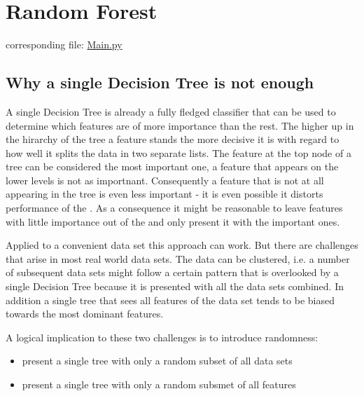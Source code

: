 \documentclass[letterpaper,10pt,english]{sphinxmanual}
\begin{document}
\section{Random Forest}
\label{\detokenize{RF:random-forest}}\label{\detokenize{RF::doc}}\label{\detokenize{RF:id1}}
corresponding file: \href{https://github.com/weinertmos/ForestFire/blob/master/source/ForestFire/Main.py}{Main.py}


\subsection{Why a single Decision Tree is not enough}
\label{\detokenize{RF:why-a-single-decision-tree-is-not-enough}}
A single Decision Tree is already a fully fledged classifier that can be used to determine which features are of more importance than the rest.
The higher up in the hirarchy of the tree a feature stands the more decisive it is with regard to how well it splits the data in two separate lists.
The feature at the top node of a tree can be considered the most important one, a feature that appears on the lower levels is not as importnant.
Consequently a feature that is not at all appearing in the tree is even less important - it is even possible it distorts performance of the {\hyperref[\detokenize{Overview:mla}]{}}.
As a consequence it might be reasonable to leave features with little importance out of the {\hyperref[\detokenize{Overview:mla}]{}} and only present it with the important ones.

Applied to a convenient data set this approach can work.
But there are challenges that arise in most real world data sets.
The data can be clustered, i.e. a number of subsequent data sets might follow a certain pattern that is overlooked by a single Decision Tree because it is presented with all the data sets combined.
In addition a single tree that sees all features of the data set tends to be biased towards the most dominant features.

A logical implication to these two challenges is to introduce randomness:
\begin{itemize}
\item {} 
present a single tree with only a random subset of all data sets

\item {} 
present a single tree with only a random subsmet of all features

\end{itemize}
\end{document}
